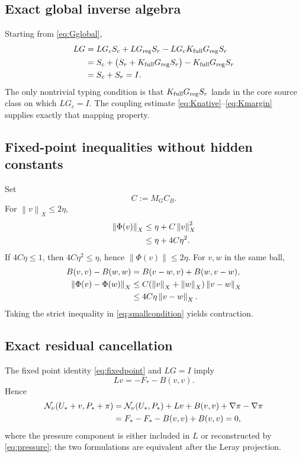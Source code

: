 \documentclass[11pt]{article}
\numberwithin{equation}{section}
\newcommand{\N}{\mathcal N}
\newcommand{\norm}[1]{\left\lVert #1\right\rVert}
\begin{document}
\subsection{Exact global inverse algebra}
Starting from \eqref{eq:Gglobal},
\begin{align}
LG
&=LG_cS_c+LG_{\rm reg}S_r-LG_cK_{\rm full}G_{\rm reg}S_r\notag\\
&=S_c+\bigl(S_r+K_{\rm full}G_{\rm reg}S_r\bigr)-K_{\rm full}G_{\rm reg}S_r\notag\\
&=S_c+S_r=I.
\label{eq:globalalgebra}
\end{align}
The only nontrivial typing condition is that \(K_{\rm full}G_{\rm reg}S_r\) lands in the core source class on which \(LG_c=I\).  The coupling estimate \eqref{eq:Knative}--\eqref{eq:Kmargin} supplies exactly that mapping property.

\subsection{Fixed-point inequalities without hidden constants}
Set
\begin{equation}
C:=M_GC_B.
\label{eq:C}
\end{equation}
For \(\norm v_X\le2\eta\),
\begin{align}
\norm{\Phi(v)}_X
&\le\eta+C\norm v_X^2\notag\\
&\le\eta+4C\eta^2.
\label{eq:mapineq}
\end{align}
If \(4C\eta\le1\), then \(4C\eta^2\le\eta\), hence \(\norm{\Phi(v)}\le2\eta\).  For \(v,w\) in the same ball,
\begin{align}
B(v,v)-B(w,w)&=B(v-w,v)+B(w,v-w),\label{eq:Bdiff}\\
\norm{\Phi(v)-\Phi(w)}_X
&\le C(\norm v_X+\norm w_X)\norm{v-w}_X\notag\\
&\le4C\eta\norm{v-w}_X.
\label{eq:lipdetail}
\end{align}
Taking the strict inequality in \eqref{eq:smallcondition} yields contraction.

\subsection{Exact residual cancellation}
The fixed point identity \eqref{eq:fixedpoint} and \(LG=I\) imply
\[
Lv=-F_*-B(v,v).
\]
Hence
\begin{align}
\N_\nu(U_*+v,P_*+\pi)
&=\N_\nu(U_*,P_*)+Lv+B(v,v)+\nabla\pi-\nabla\pi\notag\\
&=F_*-F_*-B(v,v)+B(v,v)=0,
\label{eq:exactcancel}
\end{align}
where the pressure component is either included in \(L\) or reconstructed by \eqref{eq:pressure}; the two formulations are equivalent after the Leray projection.
\end{document}
